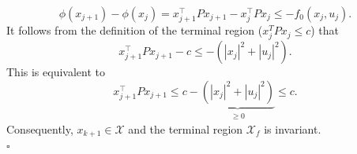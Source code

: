 \documentclass[12pt,pdftex,a4paper]{scrartcl}
\begin{document}
\begin{enumerate}
\begin{compactenum}[1.]
   \begin{equation*}
       \phi(x_{j+1})-\phi(x_j) = x_{j+1}^\top P x_{j+1} - x_j^\top P x_j \leq -f_0(x_j,u_j).
   \end{equation*}
   It follows from the definition of the terminal region ($x_j^T P x_j \leq c$) that 
   \begin{equation*}
       x_{j+1}^\top P x_{j+1} - c \leq -(|x_j|^2 + |u_j|^2).
   \end{equation*}
   This is equivalent to 
   \begin{equation*}
       x_{j+1}^\top P x_{j+1} \leq c - \underbrace{(|x_j|^2 + |u_j|^2)}_{\substack{\geq 0}} \leq c.
   \end{equation*}
   Consequently, $x_{k+1} \in \mathcal{X}$ and the terminal region $\mathcal{X}_f$ is invariant.\\
   \hspace*{133mm}$\square$
   \end{compactenum}


\end{enumerate}
\end{document}

